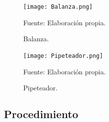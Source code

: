 \documentclass[12pt,letterpaper]{exam}
\begin{document}
\begin{multicols}{2}
\begin{figure}[H]
\centering
\texttt{[image: Balanza.png]}
\caption{Balanza.}
\begin{center}
Fuente: Elaboración propia.
\end{center}
\label{fig:Balanza}
\end{figure}


\begin{figure}[H]
\centering
\texttt{[image: Pipeteador.png]}
\caption{Pipeteador.}
\begin{center}
Fuente: Elaboración propia.
\end{center}
\label{fig:Pipeteador}
\end{figure}



\end{multicols}

\subsection{Procedimiento}

\end{document}
